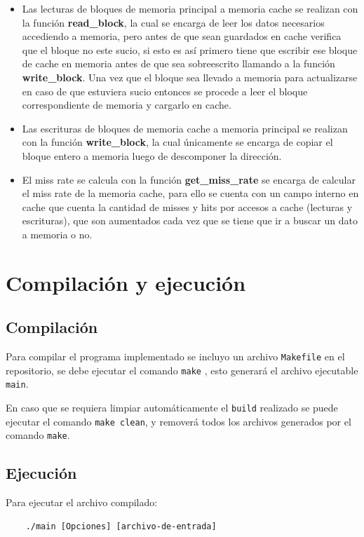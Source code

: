 \documentclass[titlepage,a4paper]{article}
\begin{document}
\begin{itemize}
\begin{itemize}
        \end{itemize}
        \item Las lecturas de bloques de memoria principal a memoria cache se realizan con la función \textbf{read\_block}, la cual se encarga de leer los datos necesarios accediendo a memoria, pero antes de que sean guardados en cache verifica que el bloque no este sucio, si esto es así primero tiene que escribir ese bloque de cache en memoria antes de que sea sobreescrito llamando a la función \textbf{write\_block}. Una vez que el bloque sea llevado a memoria para actualizarse en caso de que estuviera sucio entonces se procede a leer el bloque correspondiente de memoria y cargarlo en cache.
        \item Las escrituras de bloques de memoria cache a memoria principal se realizan con la función \textbf{write\_block}, la cual únicamente se encarga de copiar el bloque entero a memoria luego de descomponer la dirección.
        \item El miss rate se calcula con la función \textbf{get\_miss\_rate} se encarga de calcular el miss rate de la memoria cache, para ello se cuenta con un campo interno en cache que cuenta la cantidad de misses y hits por accesos a cache (lecturas y escrituras), que son aumentados cada vez que se tiene que ir a buscar un dato a memoria o no.
    \end{itemize}
    
\section{Compilación y ejecución}

\subsection{Compilación}
Para compilar el programa implementado se incluyo un archivo \verb|Makefile|   en el repositorio, se debe ejecutar el comando \verb|make| \cite{makefile}, esto generará el archivo ejecutable \verb|main|.


En caso que se requiera limpiar automáticamente el \verb|build| realizado se puede ejecutar el comando \verb|make clean|, y removerá todos los archivos generados por el comando \verb|make|.

\subsection{Ejecución}
Para ejecutar el archivo compilado:
\begin{verbatim}
    ./main [Opciones] [archivo-de-entrada]
\end{verbatim}
\end{document}
